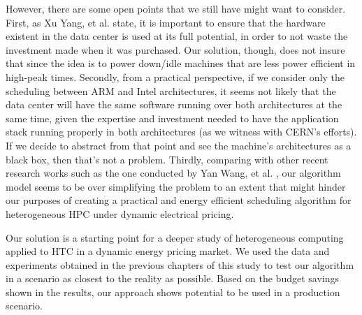 However, there are some open points that we still have might want to
consider. First, as Xu Yang, et al. \cite{DYN_PRICING_HPC} state, it is important to ensure
that the hardware existent in the data center is used at its full potential, in
order to not waste the investment made when it was purchased. Our solution,
though, does not insure that since the idea is to power down/idle machines that 
are less power efficient in high-peak times. Secondly, from a practical
perspective, if we consider only the scheduling between ARM and Intel architectures, 
it seems not likely that the data center will have the same software running
over both architectures at the same time, given the expertise and investment
needed to have the application stack running properly in both architectures (as
we witness with CERN's efforts). If we decide to abstract from that point and
see the machine's architectures as a black box, then that's not a problem. Thirdly, 
comparing with other recent research works
such as the one conducted by Yan Wang, et al. \cite{TASK_SCHED}, our algorithm model seems to be over simplifying the
problem to an extent that might hinder our purposes of creating a practical and
energy efficient scheduling algorithm for heterogeneous HPC under dynamic
electrical pricing.

Our solution is a starting point for a deeper study of heterogeneous computing applied to HTC in a dynamic energy pricing market. We used the data and experiments obtained in the previous chapters of this study to test our algorithm in a scenario as closest to the reality as possible. Based on the budget savings shown in the results, our approach shows potential to be used in a production scenario.